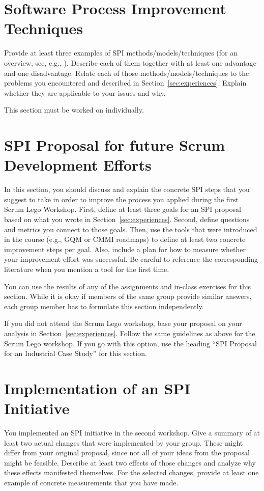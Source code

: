 \documentclass[conference]{IEEEtran}
\begin{document}
\section{Software Process Improvement Techniques}
\label{sec:spi-techniques}
Provide at least three examples of SPI methods/models/techniques (for an overview, see, e.g., \cite{Pettersson2008}). Describe each of them together with at least one advantage and one disadvantage.
Relate each of those methods/models/techniques to the problems you encountered and described in Section~\ref{sec:experiences}.
Explain whether they are applicable to your issues and why.

This section must be worked on individually.

\section{SPI Proposal for future Scrum Development Efforts}
\label{sec:proposal}
In this section, you should discuss and explain the concrete SPI steps that you suggest to take in order to improve the process you applied during the first Scrum Lego Workshop. First, define at least three goals for an SPI proposal based on what you wrote in Section~\ref{sec:experiences}. Second, define questions and metrics you connect to those goals.
Then, use the tools that were introduced in the course (e.g., GQM or CMMI roadmaps) to define at least two concrete improvement steps per goal. Also, include a plan for how to measure whether your improvement effort was successful. Be careful to reference the corresponding literature when you mention a tool for the first time.

You can use the results of any of the assignments and in-class exercises for this section. While it is okay if members of the same group provide similar answers, each group member has to formulate this section independently.

If you did not attend the Scrum Lego workshop, base your proposal on your analysis in Section~\ref{sec:experiences}. Follow the same guidelines as above for the Scrum Lego workshop. If you go with this option, use the heading ``SPI Proposal for an Industrial Case Study'' for this section.

\section{Implementation of an SPI Initiative}
\label{sec:implementation}
You implemented an SPI initiative in the second workshop.
Give a summary of at least two actual changes that were implemented by your group. These might differ from your original proposal, since not all of your ideas from the proposal might be feasible. Describe at least two effects of those changes and analyze why these effects manifested themselves.
For the selected changes, provide at least one example of concrete measurements that you have made.
\end{document}
